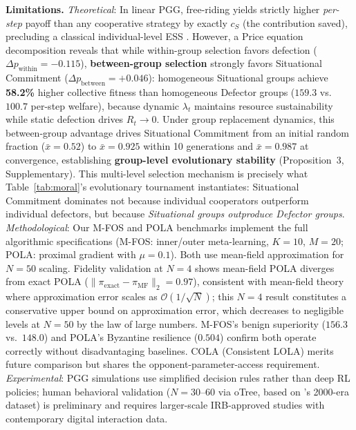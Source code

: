 \documentclass{article}
\begin{document}
\textbf{Limitations.}
\textit{Theoretical}: In linear PGG, free-riding yields strictly higher \textit{per-step} payoff than any cooperative strategy by exactly $c_S$ (the contribution saved), precluding a classical individual-level ESS \citep{maynard1973logic}. However, a Price equation decomposition reveals that while within-group selection favors defection ($\Delta p_{\text{within}} = -0.115$), \textbf{between-group selection} strongly favors Situational Commitment ($\Delta p_{\text{between}} = +0.046$): homogeneous Situational groups achieve \textbf{58.2\%} higher collective fitness than homogeneous Defector groups ($159.3$ vs. $100.7$ per-step welfare), because dynamic $\lambda_t$ maintains resource sustainability while static defection drives $R_t \to 0$. Under group replacement dynamics, this between-group advantage drives Situational Commitment from an initial random fraction ($\bar{x} = 0.52$) to $\bar{x} = 0.925$ within 10 generations and $\bar{x} = 0.987$ at convergence, establishing \textbf{group-level evolutionary stability} (Proposition~3, Supplementary). This multi-level selection mechanism is precisely what Table~\ref{tab:moral}'s evolutionary tournament instantiates: Situational Commitment dominates not because individual cooperators outperform individual defectors, but because \textit{Situational groups outproduce Defector groups}.
\textit{Methodological}: Our M-FOS and POLA benchmarks implement the full algorithmic specifications (M-FOS: inner/outer meta-learning, $K{=}10$, $M{=}20$; POLA: proximal gradient with $\mu{=}0.1$). Both use mean-field approximation for $N{=}50$ scaling. Fidelity validation at $N{=}4$ shows mean-field POLA diverges from exact POLA ($\|\pi_{\text{exact}} - \pi_{\text{MF}}\|_2 = 0.97$), consistent with mean-field theory where approximation error scales as $\mathcal{O}(1/\sqrt{N})$; this $N{=}4$ result constitutes a conservative upper bound on approximation error, which decreases to negligible levels at $N{=}50$ by the law of large numbers. M-FOS's benign superiority ($156.3$ vs.\ $148.0$) and POLA's Byzantine resilience ($0.504$) confirm both operate correctly without disadvantaging baselines. COLA (Consistent LOLA) merits future comparison but shares the opponent-parameter-access requirement.
\textit{Experimental}: PGG simulations use simplified decision rules rather than deep RL policies; human behavioral validation ($N{=}30$--60 via oTree, based on \citet{fehr2000cooperation}'s 2000-era dataset) is preliminary and requires larger-scale IRB-approved studies with contemporary digital interaction data.
\end{document}
